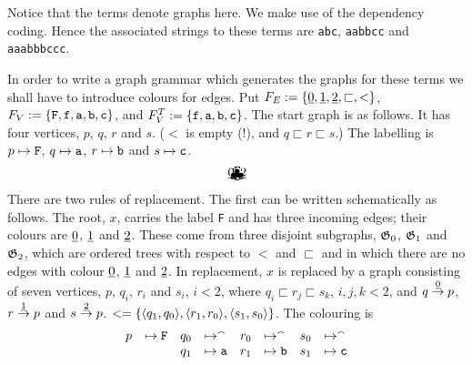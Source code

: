 Notice that the terms denote graphs here. We make use of the
dependency coding. Hence the associated strings to these terms
are {\tt abc}, {\tt aabbcc} and {\tt aaabbbccc}.

In order to write a graph grammar which generates the graphs
for these terms we shall have to introduce colours for edges.
Put $F_E := \{\underline{0}, \underline{1}, \underline{2}, \sqsubset, <\}$,
$F_V := \{\mbox{\tt F}, \mbox{\tt f}, \mbox{\tt a}, \mbox{\tt b}, 
\mbox{\tt c}\}$, and $F_V^T := \{\mbox{\tt f}, \mbox{\tt a}, 
\mbox{\tt b}, \mbox{\tt c}\}$.
The start graph is as follows. It has four vertices,
$p$, $q$, $r$ and $s$. ($<$ is empty (!), and
$q \sqsubset r \sqsubset s$.) The labelling is
$p \mapsto \mbox{\tt F}$, $q \mapsto \mbox{\tt a}$,
$r \mapsto \mbox{\tt b}$ and $s \mapsto \mbox{\tt c}$.
\begin{equation}
\begin{array}{l}
\begin{picture}(6,6)
\put(1,1.5){\makebox(0,0){$\bullet$}}
    \put(1,1.5){\vector(1,1){2.8}}
    \put(1.7,3){\makebox(0,0)[r]{$\uli{0}$}}
    \put(1,.5){\makebox(0,0){\tt a}}
\put(4,1.5){\makebox(0,0){$\bullet$}}
    \put(4,1.5){\vector(0,1){2.8}}
    \put(3.5,3){\makebox(0,0)[r]{$\uli{1}$}}
    \put(4,.5){\makebox(0,0){\tt b}}
\put(7,1.5){\makebox(0,0){$\bullet$}}
    \put(7,1.5){\vector(-1,1){2.8}}
    \put(6.3,3){\makebox(0,0)[l]{$\uli{2}$}}
    \put(7,.5){\makebox(0,0){\tt c}}
\put(4,4.5){\makebox(0,0){$\bullet$}}
    \put(4,5.5){\makebox(0,0){\tt F}}
\end{picture}
\end{array}
\end{equation}
There are two rules of replacement. The first can be written
schematically as follows. The root, $x$, carries the label {\tt F}
and has three incoming edges; their colours are
$\underline{0}$, $\underline{1}$ and $\underline{2}$. These come from three
disjoint subgraphs, $\mathfrak{G}_0$, $\mathfrak{G}_1$ and $\mathfrak{G}_2$, which are
ordered trees with respect to $<$ and $\sqsubset$ and in which
there are no edges with colour $\underline{0}$, $\underline{1}$ and $\underline{2}$.
In replacement, $x$ is replaced by a graph consisting of
seven vertices, $p$, $q_i$, $r_i$ and $s_i$, $i < 2$,
where $q_i \sqsubset r_j \sqsubset s_k$, $i,j,k < 2$,
and $q \stackrel{\underline{0}}{\rightarrow} p$, $r \stackrel{\underline{1}}{\rightarrow} p$
and $s \stackrel{\underline{2}}{\rightarrow} p$. $< = \{\langle q_1, q_0\rangle,
\langle r_1, r_0\rangle, \langle s_1, s_0\rangle\}$. The colouring is
\begin{equation}
\begin{array}{rlrlrlrl}
p & \mapsto \mbox{\tt F} & q_0 & \mapsto ^{\smallfrown} & 
r_0 & \mapsto ^{\smallfrown} & s_0 & \mapsto ^{\smallfrown} 
\\ 
 & & q_1 & \mapsto \mbox{\tt a} & r_1 & \mapsto \mbox{\tt b} 
& s_1 & \mapsto \mbox{\tt c}
\end{array}
\end{equation}
